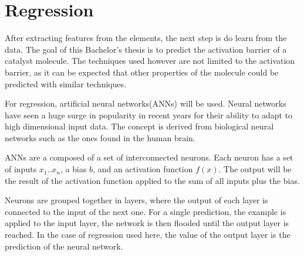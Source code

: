 
\chapter{Regression}
\label{ch:Regression}

After extracting features from the elements, the next step is do learn from the data.
The goal of this Bachelor's thesis is to predict the activation barrier of a catalyst molecule.
The techniques used however are not limited to the activation barrier, 
as it can be expected that other properties of the molecule could be predicted with similar techniques.

For regression, artificial neural networks(ANNs) will be used.
Neural networks have seen a huge surge in popularity in recent years for their ability to 
adapt to high dimensional input data.
The concept is derived from biological neural networks such as the ones found in the human brain.

ANNs are a composed of a set of interconnected neurons.
Each neuron has a set of inputs $x_1 .. x_n$, a bias $b$, and an activation function $f(x)$.
The output will be the result of the activation function applied to the sum of all inputs plus the bias.

Neurons are grouped together in layers, where the output of each layer is connected to the input of the next one.
For a single prediction, the example is applied to the input layer, the network is then flooded until the output layer is reached.
In the case of regression used here, the value of the output layer is the prediction of the neural network.


